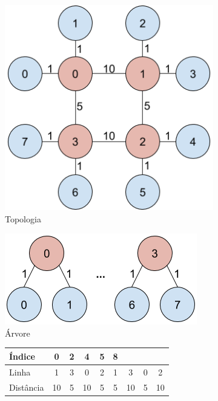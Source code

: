 \documentclass[
	12pt,				%
	openright,			%
	twoside,			%
	a4paper,			%
	english,			%
	brazil,				%
	]{abntex2}
\begin{document}
\begin{figure}[h]
\begin{subfigure}{.5\textwidth}
    \centering
    \includegraphics[width=0.8\linewidth]{images/estrutura_abst_topo.png}
    \caption{Topologia}
    \label{fig:estru:topo}
\end{subfigure}
\begin{subfigure}{.5\textwidth}
    \centering
    \includegraphics[width=0.8\linewidth]{images/estrutura_abst_arvore.png}
    \caption{Árvore}
    \label{fig:estru:arvore}
\end{subfigure}
\begin{subfigure}{.5\textwidth}
    \centering
    \begin{tabular}{|l|c|c|c|c|c|c|c|c|}
        \cline{1-6}
        Índice     & 0 & 2  & 4 & 5 & 8  \\ \hline
        Linha      & 1 & 3 & 0 & 2 & 1 & 3 & 0 & 2  \\ \hline
        Distância  & 10 & 5 & 10 & 5 & 5 & 10 & 5 & 10 \\ \hline
    \end{tabular}

\end{subfigure}
\end{figure}
\end{document}
